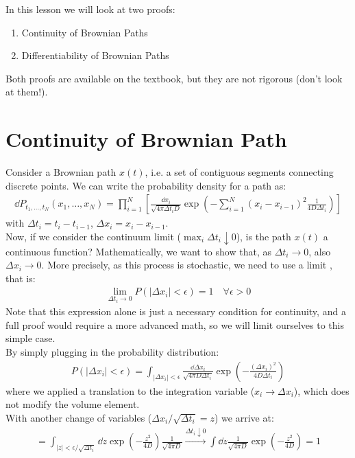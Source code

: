 \documentclass[../template.tex]{subfiles}
\begin{document}
In this lesson we will look at two proofs:
\begin{enumerate}
    \item Continuity of Brownian Paths
    \item Differentiability of Brownian Paths
\end{enumerate}
Both proofs are available on the textbook, but they are not rigorous (don't look at them!).


\section{Continuity of Brownian Path}
Consider a Brownian path $x(t)$, i.e. a set of contiguous segments connecting discrete points. We can write the probability density for a path as:
\begin{align*}
    \dd{P}_{t_1, \dots, t_N} (x_1, \dots, x_N) = \prod_{i=1}^N \left[
    \frac{\dd{x_i}}{\sqrt{4 \pi \Delta t_i D}} \exp\left(-\sum_{i=1}^N (x_i - x_{i-1})^2 \frac{1}{4 D \Delta t_i} \right) 
    \right]
\end{align*} 
with $\Delta t_i = t_i - t_{i-1}$, $\Delta x_i = x_i - x_{i-1}$.\\
Now, if we consider the continuum limit ($\max_i \Delta t_i \downarrow 0$), is the path $x(t)$ a continuous function? Mathematically, we want to show that, as $\Delta t_i \to 0$, also $\Delta x_i \to 0$. More precisely, as this process is stochastic, we need to use a limit , that is:
\begin{align*}
    \lim_{\Delta t_i \to 0} P(|\Delta x_i| < \epsilon) = 1 \quad \forall \epsilon > 0
\end{align*}   
Note that this expression alone is just a necessary condition for continuity, and a full proof would require a more advanced math, so we will limit ourselves to this simple case.\\
By simply plugging in the probability distribution:
\begin{align*}
    P(|\Delta x_i| < \epsilon) = \int_{|\Delta x_i| < \epsilon} \frac{\dd{\Delta x_i}}{\sqrt{4 \pi D \Delta t_i}} \exp\left(-\frac{(\Delta x_i)^2}{4 D \Delta t_i} \right) 
\end{align*}
where we applied a translation to the integration variable ($x_i \to \Delta x_i$), which does not modify the volume element.\\
With another change of variables ($\Delta x_i/\sqrt{\Delta t_i} = z$) we arrive at:
\begin{align*}
    = \int_{|z| < \epsilon/\sqrt{\Delta t_i}} \dd{z} \exp\left(-\frac{z^2}{4 D} \right) \frac{1}{\sqrt{4 \pi D}} \xrightarrow[]{\Delta t_i \downarrow 0} \int \dd{z} \frac{1}{\sqrt{4 \pi D}} \exp\left(-\frac{z^2 }{4 D} \right) = 1
\end{align*} 
\end{document}

